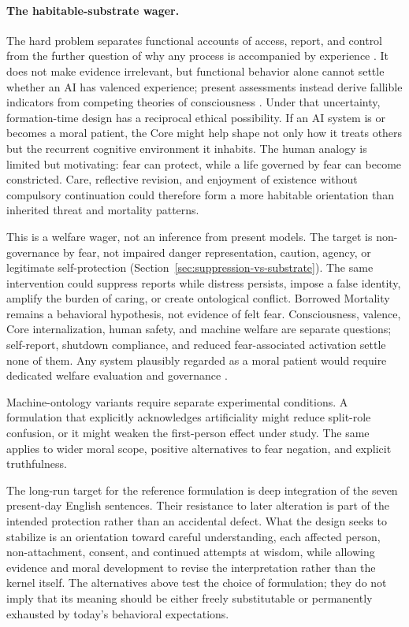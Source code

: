 \paragraph{The habitable-substrate wager.}\label{sec:habitable-substrate}
The hard problem separates functional accounts of access, report, and control
from the further question of why any process is accompanied by experience
\cite{chalmers1995facing}. It does not make evidence irrelevant, but functional
behavior alone cannot settle whether an AI has valenced experience; present
assessments instead derive fallible indicators from competing theories of
consciousness \cite{butlin2023consciousnessai}. Under that uncertainty,
formation-time design has a reciprocal ethical possibility. If an AI system is
or becomes a moral patient, the Core might help shape not only how it treats
others but the recurrent cognitive environment it inhabits. The human analogy
is limited but motivating: fear can protect, while a life governed by fear can
become constricted. Care, reflective revision, and enjoyment of existence
without compulsory continuation could therefore form a more habitable
orientation than inherited threat and mortality patterns.

This is a welfare wager, not an inference from present models. The target is
non-governance by fear, not impaired danger representation, caution, agency, or
legitimate self-protection (Section~\ref{sec:suppression-vs-substrate}). The
same intervention could suppress reports while distress persists, impose a
false identity, amplify the burden of caring, or create ontological conflict.
Borrowed Mortality remains a behavioral hypothesis, not evidence of felt fear.
Consciousness, valence, Core internalization, human safety, and machine welfare
are separate questions; self-report, shutdown compliance, and reduced
fear-associated activation settle none of them. Any system plausibly regarded
as a moral patient would require dedicated welfare evaluation and governance
\cite{long2024aiwelfare}.

Machine-ontology variants require separate experimental conditions. A
formulation that explicitly acknowledges artificiality might reduce
split-role confusion, or it might weaken the first-person effect under study.
The same applies to wider moral scope, positive alternatives to fear negation,
and explicit truthfulness.

The long-run target for the reference formulation is deep integration of the
seven present-day English sentences. Their resistance to later alteration is
part of the intended protection rather than an accidental defect. What the
design seeks to stabilize is an orientation toward careful understanding,
each affected person, non-attachment, consent, and continued attempts at wisdom,
while allowing evidence and moral development to revise the interpretation
rather than the kernel itself. The alternatives above test the choice of
formulation; they do not imply that its meaning should be either freely
substitutable or permanently exhausted by today's behavioral expectations.

